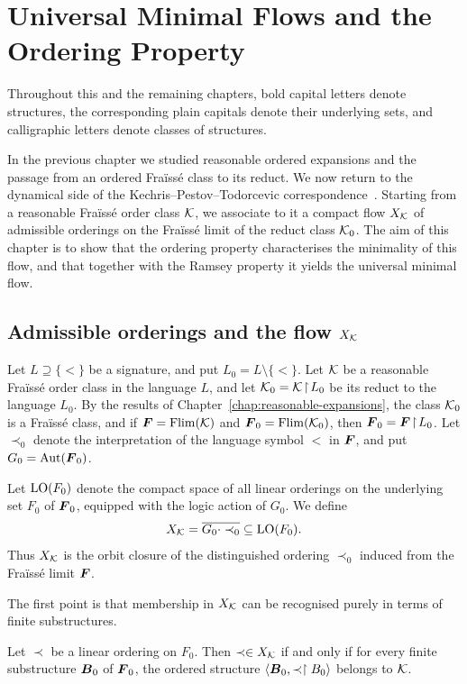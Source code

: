 \chapter{Universal Minimal Flows and the Ordering Property}
\label{chap:umf-ordering-property}
Throughout this and the remaining chapters, bold capital letters denote
structures, the corresponding plain capitals denote their underlying sets,
and calligraphic letters denote classes of structures.

In the previous chapter we studied reasonable ordered expansions and the passage from an ordered Fraïssé class to its reduct. We now return to the dynamical side of the Kechris--Pestov--Todorcevic correspondence~\cite{KPT05}. Starting from a reasonable Fraïssé order class \(\mathcal{K}\), we associate to it a compact flow \(X_{\mathcal{K}}\) of admissible orderings on the Fraïssé limit of the reduct class \(\mathcal{K}_0\). The aim of this chapter is to show that the ordering property characterises the minimality of this flow, and that together with the Ramsey property it yields the universal minimal flow.

\section{Admissible orderings and the flow \texorpdfstring{\(X_{\mathcal{K}}\)}{X K}}

Let \(L\supseteq\{<\}\) be a signature, and put \(L_0=L\setminus\{<\}\).
Let \(\mathcal{K}\) be a reasonable Fraïssé order class in the language \(L\), and let
\(\mathcal{K}_0=\mathcal{K}\!\restriction\!L_0\) be its reduct to the language \(L_0\). By the results of Chapter~\ref{chap:reasonable-expansions},
the class \(\mathcal{K}_0\) is a Fraïssé class, and if
\(\boldsymbol{F}=\operatorname{Flim}(\mathcal{K})\) and \(\boldsymbol{F}_0=\operatorname{Flim}(\mathcal{K}_0)\), then
\(\boldsymbol{F}_0=\boldsymbol{F}\!\restriction\!L_0\). Let \(\prec_0\) denote the interpretation of the language symbol
\(<\) in \(\boldsymbol{F}\), and put
\(G_0=\operatorname{Aut}(\boldsymbol{F}_0)\).

Let \(\operatorname{LO}(F_0)\) denote the compact space of all linear orderings on the underlying set \(F_0\) of \(\boldsymbol{F}_0\), equipped with the logic action of \(G_0\).
We define
\[
    X_{\mathcal{K}}=\overline{G_0\cdot \prec_0}\subseteq \operatorname{LO}(F_0).
\]
Thus \(X_{\mathcal{K}}\) is the orbit closure of the distinguished ordering \(\prec_0\) induced from the Fraïssé limit \(\boldsymbol{F}\).

The first point is that membership in \(X_{\mathcal{K}}\) can be recognised purely in terms of finite substructures.

\begin{proposition}
    \label{prop:admissible-orderings-characterization}
    Let \(\prec\) be a linear ordering on \(F_0\). Then \(\prec\in X_{\mathcal{K}}\) if and only if for every finite substructure \(\boldsymbol{B}_0\) of \(\boldsymbol{F}_0\), the ordered structure
    \(\langle \boldsymbol{B}_0,\prec\restriction B_0\rangle\) belongs to \(\mathcal{K}\).
\end{proposition}

